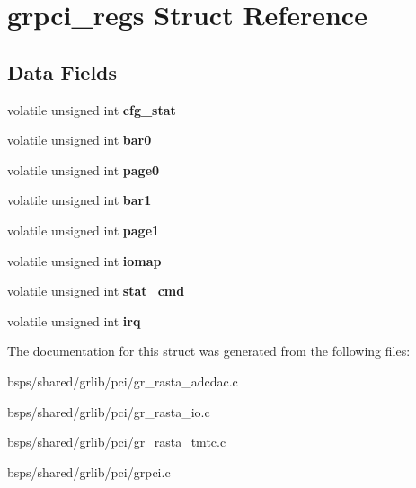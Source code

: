 \hypertarget{structgrpci__regs}{}\section{grpci\+\_\+regs Struct Reference}
\label{structgrpci__regs}
\subsection*{Data Fields}
\begin{DoxyCompactItemize}
\item 
\mbox{\label{structgrpci__regs_a5d4f4b005f610f9c9cac32eb95ce4c91}} 
volatile unsigned int {\bfseries cfg\+\_\+stat}
\item 
\mbox{\label{structgrpci__regs_a7db98939959edae139b6313b338acc73}} 
volatile unsigned int {\bfseries bar0}
\item 
\mbox{\label{structgrpci__regs_a64a6c33eafa074e10bf07281c21436a7}} 
volatile unsigned int {\bfseries page0}
\item 
\mbox{\label{structgrpci__regs_a0fbe7b981b18b2b1c7d90f4a7e263ac2}} 
volatile unsigned int {\bfseries bar1}
\item 
\mbox{\label{structgrpci__regs_abab753a98d429217bf3301d40a5cdccd}} 
volatile unsigned int {\bfseries page1}
\item 
\mbox{\label{structgrpci__regs_a4cd25803a04ffb31150010a545839b4c}} 
volatile unsigned int {\bfseries iomap}
\item 
\mbox{\label{structgrpci__regs_aeaa7f7d4bbb17daa1a9318fc32d65900}} 
volatile unsigned int {\bfseries stat\+\_\+cmd}
\item 
\mbox{\label{structgrpci__regs_a865908b101253b781fe5185db05b82bf}} 
volatile unsigned int {\bfseries irq}
\end{DoxyCompactItemize}


The documentation for this struct was generated from the following files\+:\begin{DoxyCompactItemize}
\item 
bsps/shared/grlib/pci/gr\+\_\+rasta\+\_\+adcdac.\+c\item 
bsps/shared/grlib/pci/gr\+\_\+rasta\+\_\+io.\+c\item 
bsps/shared/grlib/pci/gr\+\_\+rasta\+\_\+tmtc.\+c\item 
bsps/shared/grlib/pci/grpci.\+c\end{DoxyCompactItemize}
